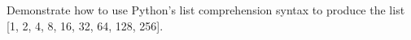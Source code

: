  \label{sssec:ex1_11}

Demonstrate how to use Python's list comprehension syntax to produce the list [1, 2, 4, 8, 16, 32, 64, 128, 256].

